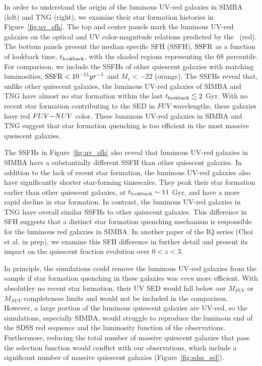 In order to understand the origin of the luminous UV-red galaxies in SIMBA
(left) and TNG (right), we examine their star formation histories in
Figure~\ref{fig:uv_sfh}.
The top and center panels mark the luminous UV-red galaxies on the optical
and UV color-magnitude relations predicted by the \eda~(red). 
The bottom panels present the median specific SFH (SSFH), ${\rm SSFR}$ as a
function of lookback time, $t_{\rm lookback}$, with the shaded regions
representing the 68 percentile.
For comparison, we include the SSFHs of other quiescent galaxies with matching
luminosities, ${\rm SSFR} < 10^{-11}yr^{-1}$ and $M_r < -22$ (orange).
The SSFHs reveal that, unlike other quiescent galaxies, the luminous UV-red
galaxies of SIMBA and TNG have  almost no star formation within the last $t_{\rm lookback} \lesssim 2$ Gyr.
With no recent star formation contributing to the SED in $FUV$ wavelengths,
these galaxies have red $FUV{-}NUV$ color.  
These luminous UV-red galaxies in SIMBA and TNG suggest that star formation
quenching is too efficient in the most massive queiscent galaxies.

The SSFHs in Figure~\ref{fig:uv_sfh} also reveal that luminous UV-red
galaxies in SIMBA have a substantially different SSFH than other quiescent
galaxies. 
In addition to the lack of recent star formation, the luminous UV-red galaxies
also have significantly shorter star-forming timescales. 
They peak their star formation earlier than other quiescent galaxies, at
$t_{\rm lookback}\sim 11$ Gyr, and have a more rapid decline in star
formation. 
In contrast, the luminous UV-red galaxies in TNG have overall similar
SSFHs to other quiescent galaxies. 
This difference in SFH suggests that a distinct star formation quenching
mechanism is responsible for the luminous red galaxies in SIMBA. 
In another paper of the IQ series (Choi et al. in prep), we examine this
SFH difference in further detail and present its impact on the quiescent 
fraction evolution over $0 < z < 3$. 

In principle, the simulations could remove the luminous UV-red galaxies
from the sample if star formation quenching in these galaxies was {\em even}
more efficient. 
With absolutley no recent star formation, their UV SED would fall below our
$M_{FUV}$ or $M_{NUV}$ completeness limits and would not be included in the comparison.  
However, a large portion of the luminous quiescent galaxies are UV-red, so the
simulations, especially SIMBA, would struggle to reproduce the luminous end of
the SDSS red sequence and the luminosity function of the observations. 
Furthermore, reducing the total number of massive quiescent galaxies that pass
the selection function would conflict with our observations, which include a
significant number of massive quiescent galaxies (Figure~\ref{fig:sdss_sel}). 

